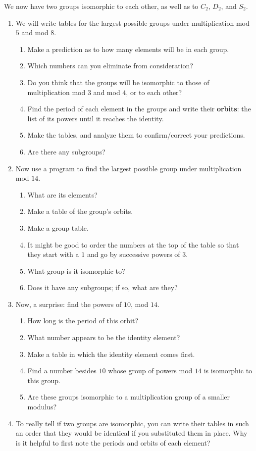 \documentclass[../gatm.tex]{subfiles}
\begin{document}
\noindent We now have two groups isomorphic to each other, as well as to $C_2$, $D_2$, and $S_2$.

\begin{enumerate}
\setcounter{enumi}{\value{problem_i}}
\item We will write tables for the largest possible groups under multiplication mod $5$ and mod $8$.
\begin{enumerate}
\item Make a prediction as to how many elements will be in each group.
\item Which numbers can you eliminate from consideration?
\item Do you think that the groups will be isomorphic to those of multiplication mod $3$ and mod $4$, or to each other?
\item Find the period of each element in the groups and write their \textbf{orbits}: the list of its powers until it reaches the identity.
\item Make the tables, and analyze them to confirm/correct your predictions.
\item Are there any subgroups?
\end{enumerate}
\item Now use a program to find the largest possible group under multiplication mod $14$.
\begin{enumerate}
\item What are its elements?
\item Make a table of the group's orbits.
\item Make a group table.
\item It might be good to order the numbers at the top of the table so that they start with a $1$ and go by successive powers of $3$.
\item What group is it isomorphic to?
\item Does it have any subgroups; if so, what are they?
\end{enumerate}
\item Now, a surprise: find the powers of $10$, mod $14$.
\begin{enumerate}
\item How long is the period of this orbit?
\item What number appears to be the identity element?
\item Make a table in which the identity element comes first.
\item Find a number besides $10$ whose group of powers mod $14$ is isomorphic to this group.
\item Are these groups isomorphic to a multiplication group of a smaller modulus?
\end{enumerate}
\item To really tell if two groups are isomorphic, you can write their tables in such an order that they would be identical if you substituted them in place. Why is it helpful to first note the periods and orbits of each element?
\setcounter{problem_i}{\value{enumi}}
\end{enumerate}
\end{document}
